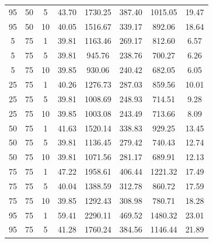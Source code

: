 \begin{table}[H]
\begin{tabular}{ccc|c|c|c|c|c}
95 & 50 & 5 & \cellcolor{gray!11}43.70 & \cellcolor{gray!1}1730.25 & \cellcolor{gray!1}387.40 & \cellcolor{gray!1}1015.05 & 19.47\\
95 & 50 & 10 & \cellcolor{gray!48}40.05 & \cellcolor{gray!1}1516.67 & \cellcolor{gray!1}339.17 & \cellcolor{gray!1}892.06 & 18.64\\
5 & 75 & 1 & \cellcolor{gray!50}39.81 & \cellcolor{gray!1}1163.46 & \cellcolor{gray!1}269.17 & \cellcolor{gray!4}812.60 & 6.57\\
5 & 75 & 5 & \cellcolor{gray!50}39.81 & \cellcolor{gray!14}945.76 & \cellcolor{gray!1}238.76 & \cellcolor{gray!38}700.27 & 6.26\\
5 & 75 & 10 & \cellcolor{gray!50}39.85 & \cellcolor{gray!16}930.06 & \cellcolor{gray!1}240.42 & \cellcolor{gray!44}682.05 & 6.05\\
25 & 75 & 1 & \cellcolor{gray!46}40.26 & \cellcolor{gray!1}1276.73 & \cellcolor{gray!1}287.03 & \cellcolor{gray!1}859.56 & 10.01\\
25 & 75 & 5 & \cellcolor{gray!50}39.81 & \cellcolor{gray!3}1008.69 & \cellcolor{gray!1}248.93 & \cellcolor{gray!34}714.51 & 9.28\\
25 & 75 & 10 & \cellcolor{gray!50}39.85 & \cellcolor{gray!4}1003.08 & \cellcolor{gray!1}243.49 & \cellcolor{gray!34}713.66 & 8.09\\
50 & 75 & 1 & \cellcolor{gray!32}41.63 & \cellcolor{gray!1}1520.14 & \cellcolor{gray!1}338.83 & \cellcolor{gray!1}929.25 & 13.45\\
50 & 75 & 5 & \cellcolor{gray!50}39.81 & \cellcolor{gray!1}1136.45 & \cellcolor{gray!1}279.42 & \cellcolor{gray!26}740.43 & 12.74\\
50 & 75 & 10 & \cellcolor{gray!50}39.81 & \cellcolor{gray!1}1071.56 & \cellcolor{gray!1}281.17 & \cellcolor{gray!41}689.91 & 12.13\\
75 & 75 & 1 & \cellcolor{gray!1}47.22 & \cellcolor{gray!1}1958.61 & \cellcolor{gray!1}406.44 & \cellcolor{gray!1}1221.32 & 17.49\\
75 & 75 & 5 & \cellcolor{gray!48}40.04 & \cellcolor{gray!1}1388.59 & \cellcolor{gray!1}312.78 & \cellcolor{gray!1}860.72 & 17.59\\
75 & 75 & 10 & \cellcolor{gray!50}39.85 & \cellcolor{gray!1}1292.43 & \cellcolor{gray!1}308.98 & \cellcolor{gray!13}780.71 & 18.28\\
95 & 75 & 1 & \cellcolor{gray!1}59.41 & \cellcolor{gray!1}2290.11 & \cellcolor{gray!1}469.52 & \cellcolor{gray!1}1480.32 & 23.01\\
95 & 75 & 5 & \cellcolor{gray!36}41.28 & \cellcolor{gray!1}1760.24 & \cellcolor{gray!1}384.56 & \cellcolor{gray!1}1146.44 & 21.89\\

\end{tabular}
\end{table}
